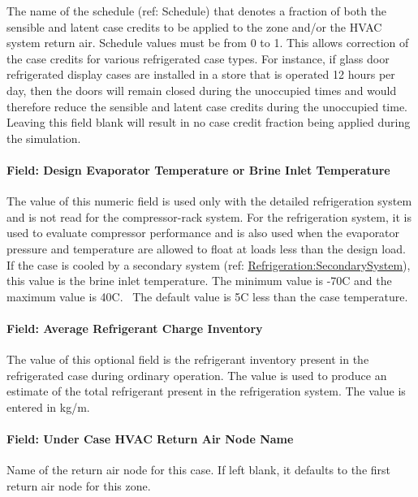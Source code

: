 The name of the schedule (ref: Schedule) that denotes a fraction of both the sensible and latent case credits to be applied to the zone and/or the HVAC system return air. Schedule values must be from 0 to 1. This allows correction of the case credits for various refrigerated case types. For instance, if glass door refrigerated display cases are installed in a store that is operated 12 hours per day, then the doors will remain closed during the unoccupied times and would therefore reduce the sensible and latent case credits during the unoccupied time. Leaving this field blank will result in no case credit fraction being applied during the simulation.

\paragraph{Field: Design Evaporator Temperature or Brine Inlet Temperature}\label{field-design-evaporator-temperature-or-brine-inlet-temperature}

The value of this numeric field is used only with the detailed refrigeration system and is not read for the compressor-rack system. For the refrigeration system, it is used to evaluate compressor performance and is also used when the evaporator pressure and temperature are allowed to float at loads less than the design load. If the case is cooled by a secondary system (ref: \hyperref[refrigerationsecondarysystem]{Refrigeration:SecondarySystem}), this value is the brine inlet temperature. The minimum value is -70C and the maximum value is 40C.~ The default value is 5C less than the case temperature.

\paragraph{Field: Average Refrigerant Charge Inventory}\label{field-average-refrigerant-charge-inventory}

The value of this optional field is the refrigerant inventory present in the refrigerated case during ordinary operation. The value is used to produce an estimate of the total refrigerant present in the refrigeration system. The value is entered in kg/m.

\paragraph{Field: Under Case HVAC Return Air Node Name}\label{under-case-hvac-return-air-node-name}

Name of the return air node for this case. If left blank, it defaults to the first return air node for this zone.

